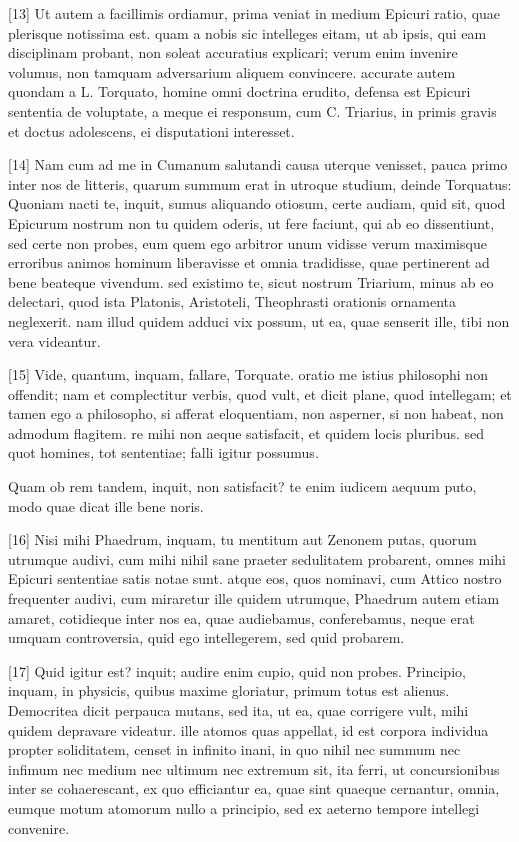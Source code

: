 \documentclass{article}
\begin{document}
[13] Ut autem a facillimis ordiamur, prima veniat in medium Epicuri ratio, quae plerisque notissima est. quam a nobis sic intelleges eitam, ut ab ipsis, qui eam disciplinam probant, non soleat accuratius explicari; verum enim invenire volumus, non tamquam adversarium aliquem convincere. accurate autem quondam a L. Torquato, homine omni doctrina erudito, defensa est Epicuri sententia de voluptate, a meque ei responsum, cum C. Triarius, in primis gravis et doctus adolescens, ei disputationi interesset.

[14] Nam cum ad me in Cumanum salutandi causa uterque venisset, pauca primo inter nos de litteris, quarum summum erat in utroque studium, deinde Torquatus: Quoniam nacti te, inquit, sumus aliquando otiosum, certe audiam, quid sit, quod Epicurum nostrum non tu quidem oderis, ut fere faciunt, qui ab eo dissentiunt, sed certe non probes, eum quem ego arbitror unum vidisse verum maximisque erroribus animos hominum liberavisse et omnia tradidisse, quae pertinerent ad bene beateque vivendum. sed existimo te, sicut nostrum Triarium, minus ab eo delectari, quod ista Platonis, Aristoteli, Theophrasti orationis ornamenta neglexerit. nam illud quidem adduci vix possum, ut ea, quae senserit ille, tibi non vera videantur.

[15] Vide, quantum, inquam, fallare, Torquate. oratio me istius philosophi non offendit; nam et complectitur verbis, quod vult, et dicit plane, quod intellegam; et tamen ego a philosopho, si afferat eloquentiam, non asperner, si non habeat, non admodum flagitem. re mihi non aeque satisfacit, et quidem locis pluribus. sed quot homines, tot sententiae; falli igitur possumus.

Quam ob rem tandem, inquit, non satisfacit? te enim iudicem aequum puto, modo quae dicat ille bene noris.

[16] Nisi mihi Phaedrum, inquam, tu mentitum aut Zenonem putas, quorum utrumque audivi, cum mihi nihil sane praeter sedulitatem probarent, omnes mihi Epicuri sententiae satis notae sunt. atque eos, quos nominavi, cum Attico nostro frequenter audivi, cum miraretur ille quidem utrumque, Phaedrum autem etiam amaret, cotidieque inter nos ea, quae audiebamus, conferebamus, neque erat umquam controversia, quid ego intellegerem, sed quid probarem.

[17] Quid igitur est? inquit; audire enim cupio, quid non probes. Principio, inquam, in physicis, quibus maxime gloriatur, primum totus est alienus. Democritea dicit perpauca mutans, sed ita, ut ea, quae corrigere vult, mihi quidem depravare videatur. ille atomos quas appellat, id est corpora individua propter soliditatem, censet in infinito inani, in quo nihil nec summum nec infimum nec medium nec ultimum nec extremum sit, ita ferri, ut concursionibus inter se cohaerescant, ex quo efficiantur ea, quae sint quaeque cernantur, omnia, eumque motum atomorum nullo a principio, sed ex aeterno tempore intellegi convenire.
\end{document}
